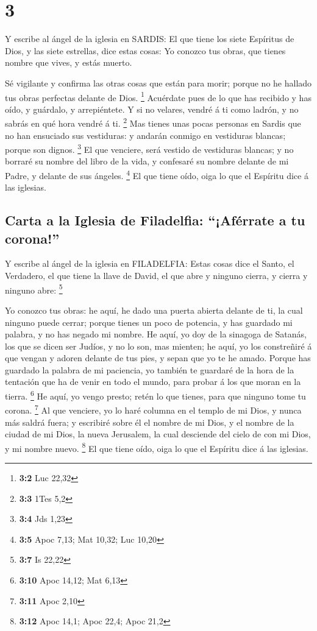 \hypertarget{section-2}{%
\section{3}\label{section-2}}

 Y escribe al ángel de la iglesia en SARDIS: El que tiene
los siete Espíritus de Dios, y las siete estrellas, dice estas cosas: Yo
conozco tus obras, que tienes nombre que vives, y estás muerto.

 Sé vigilante y confirma las otras cosas que están para
morir; porque no he hallado tus obras perfectas delante de Dios.
\footnote{\textbf{3:2} Luc 22,32}  Acuérdate pues de lo que
has recibido y has oído, y guárdalo, y arrepiéntete. Y si no velares,
vendré á ti como ladrón, y no sabrás en qué hora vendré á ti.
\footnote{\textbf{3:3} 1Tes 5,2}  Mas tienes unas pocas
personas en Sardis que no han ensuciado sus vestiduras: y andarán
conmigo en vestiduras blancas; porque son dignos. \footnote{\textbf{3:4}
  Jds 1,23}  El que venciere, será vestido de vestiduras
blancas; y no borraré su nombre del libro de la vida, y confesaré su
nombre delante de mi Padre, y delante de sus ángeles. \footnote{\textbf{3:5}
  Apoc 7,13; Mat 10,32; Luc 10,20}  El que tiene oído, oiga
lo que el Espíritu dice á las iglesias.

\hypertarget{carta-a-la-iglesia-de-filadelfia-afuxe9rrate-a-tu-corona}{%
\subsection{Carta a la Iglesia de Filadelfia: ``¡Aférrate a tu
corona!''}\label{carta-a-la-iglesia-de-filadelfia-afuxe9rrate-a-tu-corona}}

 Y escribe al ángel de la iglesia en FILADELFIA: Estas cosas
dice el Santo, el Verdadero, el que tiene la llave de David, el que abre
y ninguno cierra, y cierra y ninguno abre: \footnote{\textbf{3:7} Is
  22,22}

 Yo conozco tus obras: he aquí, he dado una puerta abierta
delante de ti, la cual ninguno puede cerrar; porque tienes un poco de
potencia, y has guardado mi palabra, y no has negado mi nombre.
 He aquí, yo doy de la sinagoga de Satanás, los que se dicen
ser Judíos, y no lo son, mas mienten; he aquí, yo los constreñiré á que
vengan y adoren delante de tus pies, y sepan que yo te he amado.
 Porque has guardado la palabra de mi paciencia, yo también
te guardaré de la hora de la tentación que ha de venir en todo el mundo,
para probar á los que moran en la tierra. \footnote{\textbf{3:10} Apoc
  14,12; Mat 6,13}  He aquí, yo vengo presto; retén lo que
tienes, para que ninguno tome tu corona. \footnote{\textbf{3:11} Apoc
  2,10}  Al que venciere, yo lo haré columna en el templo
de mi Dios, y nunca más saldrá fuera; y escribiré sobre él el nombre de
mi Dios, y el nombre de la ciudad de mi Dios, la nueva Jerusalem, la
cual desciende del cielo de con mi Dios, y mi nombre nuevo. \footnote{\textbf{3:12}
  Apoc 14,1; Apoc 22,4; Apoc 21,2}  El que tiene oído, oiga
lo que el Espíritu dice á las iglesias.


